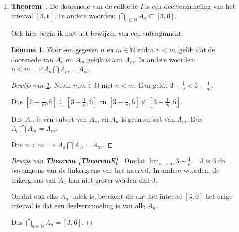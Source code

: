 \documentclass[12pt, dutch, a4paper]{article}
\theoremstyle{definition}
\newtheorem{lemma}{Lemma}[theorem]
\newenvironment{shortthm}
  {\refstepcounter{theorem}\textbf{Theorem~\thetheorem.}}%
{\enskip}
\begin{document}
\begin{enumerate}[(a.)]
\begin{proof}[Bewijs van \textbf{Theorem \ref{theoremD}.}]
        Dus er bestaat geen $n \in \mathbb{N}$ zodat $3 - \tfrac{1}{n} > 3$. \newline
        Dus $[3,6] \subseteq A_n$ voor elke $n$.

        Dus $[3,6] \subseteq \bigcap_{n \in \mathbb{N}}A_n$. \newline
    \end{proof}
    \bigskip

    \item 
    \begin{shortthm} \label{TheoremE}
        De doorsnede van de collectie $I$ is een deelverzameling van het interval $[3,6]$.
        In andere woorden: $\bigcap_{n \in \mathbb{N}}A_n \subseteq [3,6]$.
    \end{shortthm}

    Ook hier begin ik met het bewijzen van een subargument.

    \begin{lemma} \label{LemmaE}
        Voor een gegeven $n$ en $m \in \mathbb{N}$ zodat $n < m$, 
        geldt dat de doorsnede van $A_n$ en $A_m$ gelijk is aan $A_m$.  
        In andere woorden: \newline
        $n < m \implies A_n \bigcap A_m = A_m$.
    \end{lemma}

    \begin{proof}[Bewijs van \textbf{\cref{LemmaE}}]
        Neem $n,m \in \mathbb{N}$ met $n < m$. \newline
        Dan geldt $3 - \frac{1}{n} < 3 - \frac{1}{m}$.

        Dus $[3 - \frac{1}{m}, 6] \subseteq [3 - \frac{1}{n}, 6]$ en 
        $[3 - \frac{1}{n}, 6] \nsubseteq [3 - \frac{1}{m}, 6]$.

        Dus $A_m$ is een subset van $A_n$, en $A_n$ is geen subset van $A_m$. \newline
        Dus $A_n \bigcap A_m = A_m$.

        Dus $n < m \implies A_n \bigcap A_m = A_m$. \newline
    \end{proof}
    \bigskip

    \begin{proof}[Bewijs van \textbf{Theorem \ref{TheoremE}}] $ $ \newline
        Omdat $\lim_{x\to\infty} 3-\tfrac{1}{a} = 3$ 
        is 3 de bovengrens van de linkergrens van het interval. In andere woorden,
        de linkergrens van $A_n$ kan niet groter worden dan 3.

        Omdat ook elke $A_n$ uniek is, 
        betekent dit dat het interval $[3,6]$ het enige interval is 
        dat een deelverzameling is van alle $A_n$.

        Dus $\bigcap_{n \in \mathbb{N}}A_n = [3,6]$. \newline
    \end{proof}
\end{enumerate}
\end{document}
